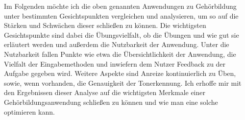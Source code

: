 %

Im Folgenden möchte ich die oben genannten Anwendungen zu Gehörbildung unter bestimmten Gesichtspunkten vergleichen und analysieren, um so auf die Stärken und Schwächen dieser schließen zu können. Die wichtigsten Gesichtspunkte sind dabei die Übungsvielfalt, ob die Übungen und wie gut sie erläutert werden  und außerdem die Nutzbarkeit der Anwendung. Unter die Nutzbarkeit fallen Punkte wie etwa die Übersichtlichkeit der Anwendung, die Vielfalt der Eingabemethoden und inwiefern dem Nutzer Feedback zu der Aufgabe gegeben wird. Weitere Aspekte sind Anreize kontinuierlich zu Üben, sowie, wenn vorhanden, die Genauigkeit der Tonerkennung. Ich erhoffe mir mit den Ergebnissen dieser Analyse auf die wichtigsten Merkmale einer Gehörbildungsanwendung schließen zu können und wie man eine solche optimieren kann. \\\\

